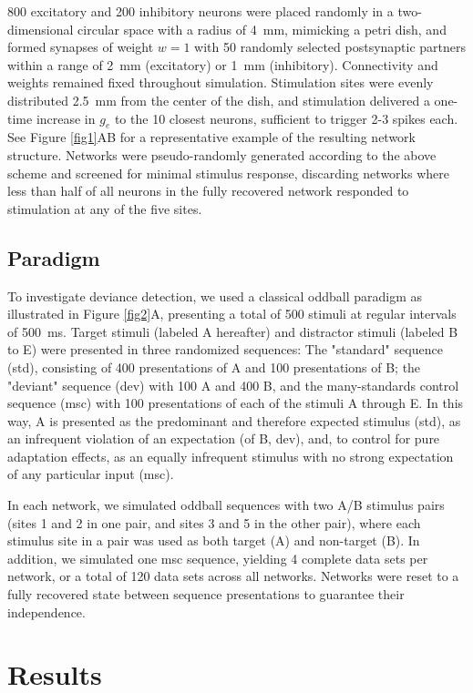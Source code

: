 \documentclass[pdflatex,iicol,sn-basic]{sn-jnl}
\theoremstyle{thmstyleone}%
\theoremstyle{thmstyletwo}%
\theoremstyle{thmstylethree}%
\begin{document}
800 excitatory and 200 inhibitory neurons were placed randomly in a two-dimensional circular space with a radius of 4~mm, mimicking a petri dish, and formed synapses of weight $w=1$ with 50 randomly selected postsynaptic partners within a range of 2~mm (excitatory) or 1~mm (inhibitory). Connectivity and weights remained fixed throughout simulation. Stimulation sites were evenly distributed 2.5~mm from the center of the dish, and stimulation delivered a one-time increase in $g_e$ to the 10 closest neurons, sufficient to trigger 2-3 spikes each. See Figure \ref{fig1}AB for a representative example of the resulting network structure. Networks were pseudo-randomly generated according to the above scheme and screened for minimal stimulus response, discarding networks where less than half of all neurons in the fully recovered network responded to stimulation at any of the five sites.

\subsection{Paradigm}\label{sec-paradigm}

To investigate deviance detection, we used a classical oddball paradigm \citep{TODO} as illustrated in Figure \ref{fig2}A, presenting a total of 500 stimuli at regular intervals of 500~ms. Target stimuli (labeled A hereafter) and distractor stimuli (labeled B to E) were presented in three randomized sequences: The "standard" sequence (std), consisting of 400 presentations of A and 100 presentations of B; the "deviant" sequence (dev) with 100 A and 400 B, and the many-standards control sequence (msc) with 100 presentations of each of the stimuli A through E. In this way, A is presented as the predominant and therefore expected stimulus (std), as an infrequent violation of an expectation (of B, dev), and, to control for pure adaptation effects, as an equally infrequent stimulus with no strong expectation of any particular input (msc).

In each network, we simulated oddball sequences with two A/B stimulus pairs (sites 1 and 2 in one pair, and sites 3 and 5 in the other pair), where each stimulus site in a pair was used as both target (A) and non-target (B). In addition, we simulated one msc sequence, yielding 4 complete data sets per network, or a total of 120 data sets across all networks. Networks were reset to a fully recovered state between sequence presentations to guarantee their independence.

\section{Results}\label{sec-results}
\end{document}
